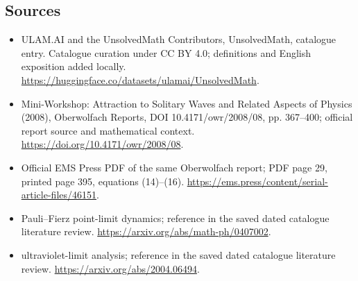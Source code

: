 \documentclass[11pt]{article}
\begin{document}
\subsection{Sources}
\begin{itemize}
\item[\hypertarget{source:statement:1}{S1}] ULAM.AI and the UnsolvedMath Contributors, UnsolvedMath, catalogue entry. Catalogue curation under CC BY 4.0; definitions and English exposition added locally.
\url{https://huggingface.co/datasets/ulamai/UnsolvedMath}.
\item[\hypertarget{source:statement:2}{S2}] Mini-Workshop: Attraction to Solitary Waves and Related Aspects of Physics (2008), Oberwolfach Reports, DOI 10.4171/owr/2008/08, pp. 367--400; official report source and mathematical context.
\url{https://doi.org/10.4171/owr/2008/08}.
\item[\hypertarget{source:statement:3}{S3}] Official EMS Press PDF of the same Oberwolfach report; PDF page 29, printed page 395, equations (14)--(16).
\url{https://ems.press/content/serial-article-files/46151}.
\item[\hypertarget{source:statement:4}{S4}] Pauli--Fierz point-limit dynamics; reference in the saved dated catalogue literature review.
\url{https://arxiv.org/abs/math-ph/0407002}.
\item[\hypertarget{source:statement:5}{S5}] ultraviolet-limit analysis; reference in the saved dated catalogue literature review.
\url{https://arxiv.org/abs/2004.06494}.
\end{itemize}
\label{end:statement}
\end{document}
